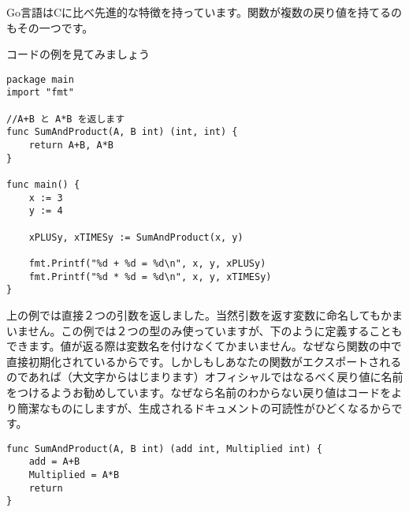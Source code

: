 Go言語はCに比べ先進的な特徴を持っています。関数が複数の戻り値を持てるのもその一つです。

コードの例を見てみましょう

\begin{lstlisting}[numbers=none]
package main
import "fmt"

//A+B と A*B を返します
func SumAndProduct(A, B int) (int, int) {
    return A+B, A*B
}

func main() {
    x := 3
    y := 4

    xPLUSy, xTIMESy := SumAndProduct(x, y)

    fmt.Printf("%d + %d = %d\n", x, y, xPLUSy)
    fmt.Printf("%d * %d = %d\n", x, y, xTIMESy)
}
\end{lstlisting}

上の例では直接２つの引数を返しました。当然引数を返す変数に命名してもかまいません。この例では２つの型のみ使っていますが、下のように定義することもできます。値が返る際は変数名を付けなくてかまいません。なぜなら関数の中で直接初期化されているからです。しかしもしあなたの関数がエクスポートされるのであれば（大文字からはじまります）オフィシャルではなるべく戻り値に名前をつけるようお勧めしています。なぜなら名前のわからない戻り値はコードをより簡潔なものにしますが、生成されるドキュメントの可読性がひどくなるからです。

\begin{lstlisting}[numbers=none]
func SumAndProduct(A, B int) (add int, Multiplied int) {
    add = A+B
    Multiplied = A*B
    return
}
\end{lstlisting}


